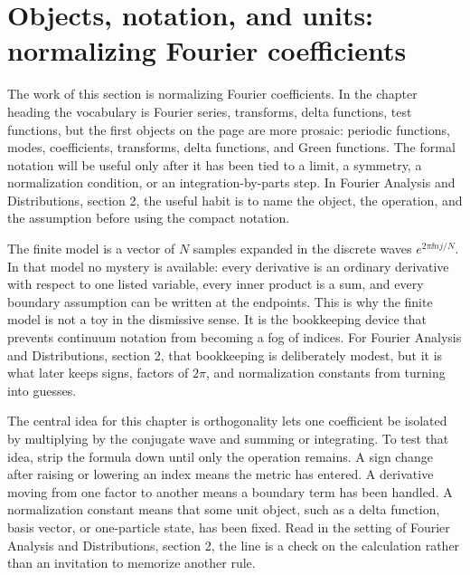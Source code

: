 \section{Objects, notation, and units: normalizing Fourier coefficients}













The work of this section is normalizing Fourier coefficients.  In the chapter heading the vocabulary is Fourier series, transforms, delta functions, test functions, but the first objects on the page are more prosaic: periodic functions, modes, coefficients, transforms, delta functions, and Green functions.  The formal notation will be useful only after it has been tied to a limit, a symmetry, a normalization condition, or an integration-by-parts step.  In Fourier Analysis and Distributions, section 2, the useful habit is to name the object, the operation, and the assumption before using the compact notation.

The finite model is a vector of \(N\) samples expanded in the discrete waves \(e^{2\pi \ii nj/N}\).  In that model no mystery is available: every derivative is an ordinary derivative with respect to one listed variable, every inner product is a sum, and every boundary assumption can be written at the endpoints.  This is why the finite model is not a toy in the dismissive sense.  It is the bookkeeping device that prevents continuum notation from becoming a fog of indices.  For Fourier Analysis and Distributions, section 2, that bookkeeping is deliberately modest, but it is what later keeps signs, factors of \(2\pi\), and normalization constants from turning into guesses.

The central idea for this chapter is orthogonality lets one coefficient be isolated by multiplying by the conjugate wave and summing or integrating.  To test that idea, strip the formula down until only the operation remains.  A sign change after raising or lowering an index means the metric has entered.  A derivative moving from one factor to another means a boundary term has been handled.  A normalization constant means that some unit object, such as a delta function, basis vector, or one-particle state, has been fixed.  Read in the setting of Fourier Analysis and Distributions, section 2, the line is a check on the calculation rather than an invitation to memorize another rule.


